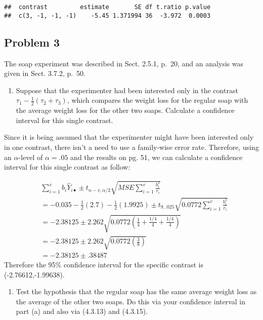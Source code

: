 \documentclass[12pt,]{article}
\providecommand{\tightlist}{%
  \setlength{\itemsep}{0pt}\setlength{\parskip}{0pt}}
\begin{document}
\begin{verbatim}
##  contrast         estimate       SE df t.ratio p.value
##  c(3, -1, -1, -1)    -5.45 1.371994 36  -3.972  0.0003
\end{verbatim}

\subsection{Problem 3}\label{problem-3}

The soap experiment was described in Sect. 2.5.1, p.~20, and an analysis
was given in Sect. 3.7.2, p.~50.

\begin{enumerate}
\def\labelenumi{(\alph{enumi})}
\tightlist
\item
  Suppose that the experimenter had been interested only in the contrast
  \(\tau_1 - \frac{1}{2}(\tau_2 + \tau_3)\), which compares the weight
  loss for the regular soap with the average weight loss for the other
  two soaps. Calculate a confidence interval for this single contrast.
\end{enumerate}

Since it is being assumed that the experimenter might have been
interested only in one contrast, there isn't a need to use a family-wise
error rate. Therefore, using an \(\alpha\)-level of \(\alpha=.05\) and
the results on pg. 51, we can calculate a confidence interval for this
single contrast as follow:

\[
\begin{aligned}
& \sum_{i=1}^v b_i\hat{Y}_{i\bullet} \pm t_{n-v,\alpha/2} \sqrt{MSE \sum_{i=1}^v \frac{b_i^2}{r_i}}\\
&= -0.035- \frac{1}{2}(2.7) - \frac{1}{2}(1.9925) \pm t_{9,.025}
 \sqrt{0.0772 \sum_{i=1}^v \frac{b_i^2}{r_i}}\\
&= -2.38125 \pm 2.262\sqrt{0.0772 \left( \frac{1}{4} + \frac{1/4}{4} + \frac{1/4}{4} \right)}\\
&= -2.38125 \pm 2.262\sqrt{0.0772 \left( \frac{3}{8}  \right)}\\
&= -2.38125 \pm .38487
\end{aligned}
\] Therefore the 95\% confidence interval for the specific contrast is
(-2.76612,-1.99638).

\begin{enumerate}
\def\labelenumi{(\alph{enumi})}
\setcounter{enumi}{1}
\tightlist
\item
  Test the hypothesis that the regular soap has the same average weight
  loss as the average of the other two soaps. Do this via your
  confidence interval in part (a) and also via (4.3.13) and (4.3.15).
\end{enumerate}
\end{document}
